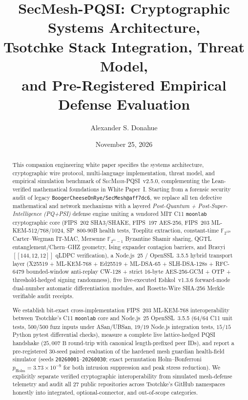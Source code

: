 \documentclass[11pt,reqno]{amsart}
\title[SecMesh-PQSI: Cryptographic Systems Architecture and Threat Model]{%
  SecMesh-PQSI: Cryptographic Systems Architecture,\\
  Tsotchke Stack Integration, Threat Model,\\
  and Pre-Registered Empirical Defense Evaluation}
\author{Alexander S. Donahue}
\date{November 25, 2026}
\newcommand{\F}{\mathbb{F}}
\newcommand{\code}[1]{\texttt{\small #1}}
\begin{document}
\begin{abstract}
This companion engineering white paper specifies the systems architecture, cryptographic wire protocol, multi-language implementation, threat model, and empirical simulation benchmark of \textsc{SecMesh-PQSI}~v2.5.0, complementing the Lean-verified mathematical foundations in White Paper~I.
Starting from a forensic security audit of legacy \code{BoogerCheeseOnRye/SecMesh@aff7dc6}, we replace all ten defective mathematical and network mechanisms with a layered \emph{Post-Quantum + Post-Super-Intelligence (PQ+PSI)} defense engine uniting a vendored MIT C11 \code{moonlab} cryptographic core (FIPS~202 SHA3/SHAKE, FIPS~197 AES-256, FIPS~203 ML-KEM-512/768/1024, SP~800-90B health tests, Toeplitz extraction, constant-time $\F_{2^{128}}$ Carter--Wegman IT-MAC, Mersenne $\F_{2^{61}-1}$ Byzantine Shamir sharing, QGTL entanglement/Chern--GHZ geometry, Ising expander contagion barriers, and Bravyi $[[144,12,12]]$ qLDPC verification), a Node.js~25 / OpenSSL~3.5.5 hybrid transport layer (X25519 + ML-KEM-768 + Ed25519 + ML-DSA-65 + SLH-DSA-128s + RFC-6479 bounded-window anti-replay CW-128 + strict 16-byte AES-256-GCM + OTP + threshold-hedged signing randomness), five live-executed Eshkol~v1.3.6 forward-mode dual-number automatic differentiation modules, and Rosette-Wire SHA-256 Merkle verifiable audit receipts.

We establish bit-exact cross-implementation FIPS~203 ML-KEM-768 interoperability between Tsotchke's C11 \code{moonlab} core and Node.js~25 OpenSSL~3.5.5 ($64/64$ C11 unit tests, $500/500$ fuzz inputs under ASan/UBSan, $19/19$ Node.js integration tests, $15/15$ Python pytest differential checks), measure a complete live lattice-hedged PQSI handshake ($25{,}007\text{ B}$ round-trip with canonical length-prefixed peer IDs), and report a pre-registered $30$-seed paired evaluation of the hardened mesh guardian health-field simulator (seeds \code{20260001}--\code{20260030}; exact permutation Holm--Bonferroni $p_{\mathrm{Holm}} = 3.73 \times 10^{-9}$ for both intrusion suppression and peak stress reduction).
We explicitly separate verified cryptographic interoperability from simulated mesh-defense telemetry and audit all $27$ public repositories across Tsotchke's GitHub namespaces honestly into integrated, optional-connector, and out-of-scope categories.
\end{abstract}

\maketitle
\end{document}
